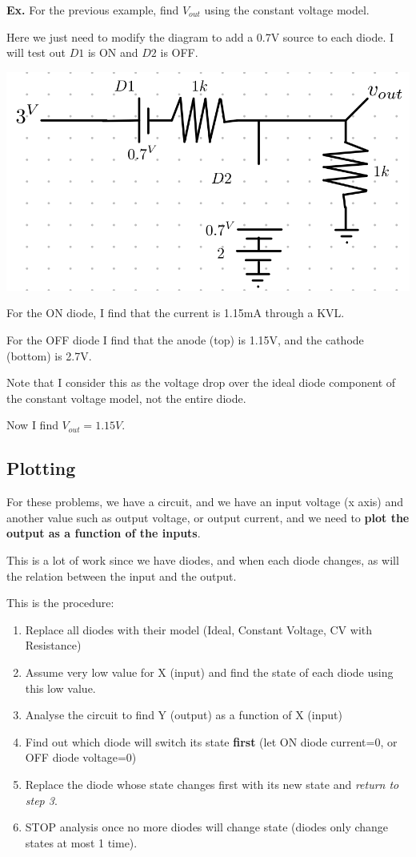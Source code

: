 \documentclass[12pt,letterpaper]{article} \usepackage{amsmath} \usepackage{graphicx} \usepackage[margin=1in]{geometry} \usepackage{longtable}  \usepackage{amssymb}
\begin{document}
	\begin{mdframed}
		\textbf{Ex.} For the previous example, find $V_{out}$ using the constant voltage model.
		
		Here we just need to modify the diagram to add a 0.7V source to each diode. I will test out $D1$ is ON and $D2$ is OFF.
		\begin{center}
			\includegraphics[width=0.4\linewidth]{diodes-ex2.1}
		\end{center}
		For the ON diode, I find that the current is 1.15mA through a KVL. 
		
		For the OFF diode I find that the anode (top) is 1.15V, and the cathode (bottom) is 2.7V. 
		
		Note that I consider this as the voltage drop over the ideal diode component of the constant voltage model, not the entire diode. 
		
		Now I find $V_{out} = 1.15V$.
	\end{mdframed}
	
	\subsection{Plotting}
	For these problems, we have a circuit, and we have an input voltage (x axis) and another value such as output voltage, or output current, and we need to \textbf{plot the output as a function of the inputs}. 
	
	This is a lot of work since we have diodes, and when each diode changes, as will the relation between the input and the output. 
	
	This is the procedure: 
	\begin{enumerate}[noitemsep]
		\item Replace all diodes with their model (Ideal, Constant Voltage, CV with Resistance)
		\item Assume very low value for X (input) and find the state of each diode using this low value.
		\item Analyse the circuit to find Y (output) as a function of X (input)
		\item Find out which diode will switch its state \textbf{first }(let ON diode current=0, or OFF diode voltage=0)
		\item Replace the diode whose state changes first with its new state and \textit{return to step 3}. 
		\item STOP analysis once no more diodes will change state (diodes only change states at most 1 time).
	\end{enumerate}
\end{document}
